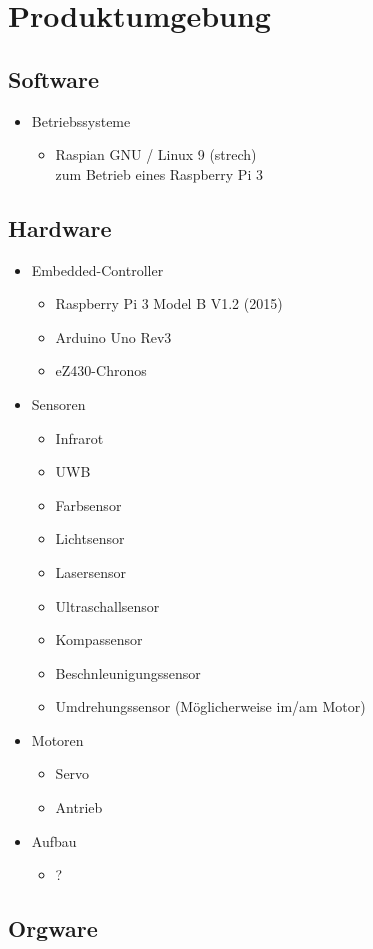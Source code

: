 \section{Produktumgebung}


\subsection{Software}

\begin{itemize}
    \item Betriebssysteme
        \begin{itemize}
            \item Raspian GNU / Linux 9 (strech) \\ zum Betrieb eines Raspberry Pi 3
        \end{itemize}
\end{itemize}

\subsection{Hardware}

\begin{itemize}
    \item Embedded-Controller
        \begin{itemize}
            \item Raspberry Pi 3 Model B V1.2 (2015)
            \item Arduino Uno Rev3
            \item eZ430-Chronos
        \end{itemize}
    \item Sensoren
        \begin{itemize}
            \item Infrarot
            \item UWB
            \item Farbsensor
            \item Lichtsensor
            \item Lasersensor
            \item Ultraschallsensor
            \item Kompassensor
            \item Beschnleunigungssensor
            \item Umdrehungssensor (Möglicherweise im/am Motor)
        \end{itemize}
    \item Motoren
        \begin{itemize}
            \item Servo
            \item Antrieb
        \end{itemize}
    \item Aufbau
        \begin{itemize}
            \item ?
        \end{itemize}
\end{itemize}

\subsection{Orgware}

